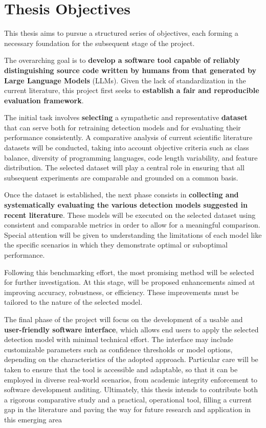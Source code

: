 \clearpage

\section{Thesis Objectives}
This thesis aims to pursue a structured series 
of objectives, each forming a necessary foundation 
for the subsequent stage of the project.

The overarching goal is to \textbf{develop a software 
tool capable of reliably distinguishing source 
code written by humans from that generated by 
Large Language Models} (LLMs). Given the lack of 
standardization in the current literature, this 
project first seeks to \textbf{establish a fair and 
reproducible evaluation framework}.

The initial task involves \textbf{selecting} a 
sympathetic and representative \textbf{dataset} 
that can serve both for retraining detection 
models and for evaluating their performance 
consistently. A comparative analysis of 
current scientific literature datasets 
will be conducted, taking into 
account objective criteria such as class 
balance, diversity of programming languages, 
code length variability, and feature distribution. 
The selected dataset will play a central role in 
ensuring that all subsequent experiments are 
comparable and grounded on a common basis.

Once the dataset is established, the next 
phase consists in \textbf{collecting and systematically 
evaluating the various detection models 
suggested in recent literature}. These models 
will be executed on the selected dataset 
using consistent and comparable metrics in 
order to allow for a meaningful comparison. 
Special attention will be given to 
understanding the limitations 
of each model like the specific scenarios in 
which they demonstrate optimal or suboptimal performance.

Following this benchmarking effort, the 
most promising method will be selected for 
further investigation. At this stage, will be
proposed enhancements aimed at improving accuracy, 
robustness, or efficiency. These improvements 
must be tailored to the nature of the selected 
model.

The final phase of the project will focus on 
the development of a usable and \textbf{user-friendly 
software interface}, which allows end users 
to apply the selected detection model with 
minimal technical effort. The interface may 
include customizable parameters such as 
confidence thresholds or model options, 
depending on the characteristics of the 
adopted approach. Particular care will be 
taken to ensure that the tool is accessible 
and adaptable, so that it can be employed in 
diverse real-world scenarios, from academic 
integrity enforcement to software development auditing.
Ultimately, this thesis intends to contribute 
both a rigorous comparative study and a 
practical, operational tool, filling a 
current gap in the literature and paving 
the way for future research and application 
in this emerging area
